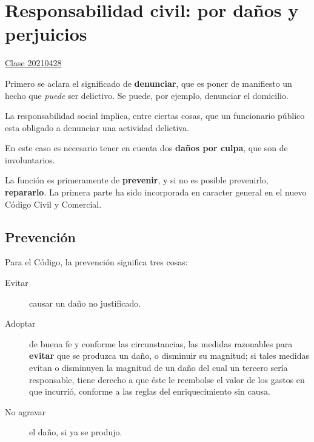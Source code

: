 \documentclass[../main.tex]{subfiles}
\begin{document}
\section{Responsabilidad civil: por daños y perjuicios}
\href{https://youtu.be/EdKKZ3BBUnE}{Clase 20210428}

Primero se aclara el significado de \textbf{denunciar}, que es poner de
manifiesto un hecho que \textit{puede} ser delictivo. Se puede, por ejemplo,
denunciar el domicilio.

La responsabilidad social implica, entre ciertas cosas, que un funcionario público
esta obligado a denunciar una actividad delictiva.

En este caso es necesario tener en cuenta dos \textbf{daños por culpa}, que son
de involuntarios.

\vspace{0.333cm}
\begin{center}
\end{center}
\vspace{0.3cm}

La función es primeramente de \textbf{prevenir}, y si no es posible prevenirlo,
\textbf{repararlo}. La primera parte ha sido incorporada en caracter general en 
el nuevo Código Civil y Comercial.

\subsection{Prevención}

Para el Código, la prevención significa tres cosas:

\begin{description}
  \item[Evitar] causar un daño no justificado.
  \item[Adoptar] de buena fe y conforme las circunstancias, las medidas razonables
    para \textbf{evitar} que se produzca un daño, o disminuir su magnitud; si
    tales medidas evitan o disminuyen la magnitud de un daño del cual un tercero
    sería responsable, tiene derecho a que éste le reembolse el valor de los
    gastos en que incurrió, conforme a las reglas del enriquecimiento sin causa.
  \item[No agravar] el daño, si ya se produjo.
\end{description}
\end{document}
